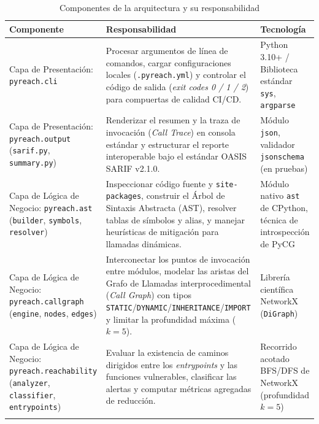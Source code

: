 \begin{table}[H]
\centering
\caption{Componentes de la arquitectura y su responsabilidad}
\label{p5:tab:componentes_arquitectura}
\footnotesize
{}
\begin{tabularx}{\textwidth}{p{4.2cm} X p{3.2cm}}
\toprule
\textbf{Componente} & \textbf{Responsabilidad} & \textbf{Tecnología} \\
\midrule
Capa de Presentación: \texttt{pyreach.\allowbreak cli} & 
Procesar argumentos de línea de comandos, cargar configuraciones locales (\texttt{.\allowbreak pyreach.\allowbreak yml}) y controlar el código de salida (\textit{exit codes 0 / 1 / 2}) para compuertas de calidad CI/CD. & 
Python 3.10+ / Biblioteca estándar \texttt{sys}, \texttt{argparse} \\
\addlinespace
Capa de Presentación: \texttt{pyreach.\allowbreak output} (\texttt{sarif.\allowbreak py}, \texttt{summary.\allowbreak py}) & 
Renderizar el resumen y la traza de invocación (\textit{Call Trace}) en consola estándar y estructurar el reporte interoperable bajo el estándar OASIS SARIF v2.1.0. & 
Módulo \texttt{json}, validador \texttt{jsonschema} (en pruebas) \\
\addlinespace
Capa de Lógica de Negocio: \texttt{pyreach.\allowbreak ast} (\texttt{builder}, \texttt{symbols}, \texttt{resolver}) & 
Inspeccionar código fuente y \texttt{site-\allowbreak packages}, construir el Árbol de Sintaxis Abstracta (AST), resolver tablas de símbolos y alias, y manejar heurísticas de mitigación para llamadas dinámicas. & 
Módulo nativo \texttt{ast} de CPython, técnica de introspección de PyCG \\
\addlinespace
Capa de Lógica de Negocio: \texttt{pyreach.\allowbreak callgraph} (\texttt{engine}, \texttt{nodes}, \texttt{edges}) & 
Interconectar los puntos de invocación entre módulos, modelar las aristas del Grafo de Llamadas interprocedimental (\textit{Call Graph}) con tipos \texttt{STATIC}/\texttt{DYNAMIC}/\texttt{INHERITANCE}/\texttt{IMPORT} y limitar la profundidad máxima ($k=5$). & 
Librería científica NetworkX (\texttt{DiGraph}) \\
\addlinespace
Capa de Lógica de Negocio: \texttt{pyreach.\allowbreak reachability} (\texttt{analyzer}, \texttt{classifier}, \texttt{entrypoints}) & 
Evaluar la existencia de caminos dirigidos entre los \textit{entrypoints} y las funciones vulnerables, clasificar las alertas y computar métricas agregadas de reducción. & 
Recorrido acotado BFS/DFS de NetworkX (profundidad $k=5$) \\
\addlinespace

\end{tabularx}
\end{table}
